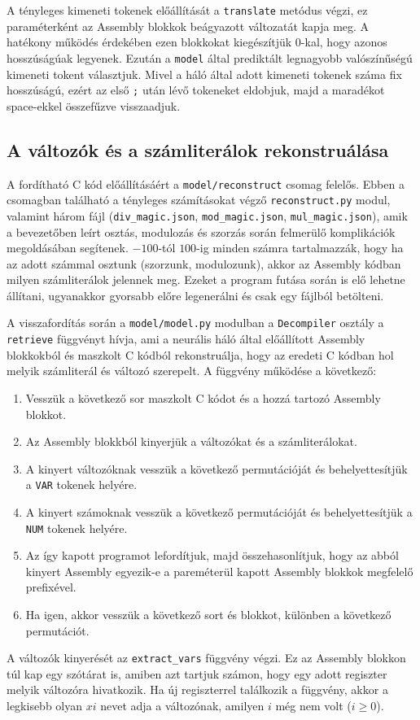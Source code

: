 A tényleges kimeneti tokenek előállítását a \texttt{translate} metódus végzi, ez paraméterként az Assembly
blokkok beágyazott változatát kapja meg. A hatékony működés érdekében ezen blokkokat kiegészítjük $0$-kal, hogy
azonos hosszúságúak legyenek. Ezután a \texttt{model} által prediktált legnagyobb valószínűségú kimeneti tokent
választjuk. Mivel a háló által adott kimeneti tokenek száma fix hosszúságú, ezért az első \texttt{;} után
lévő tokeneket eldobjuk, majd a maradékot space-ekkel összefűzve visszaadjuk.

\subsection{A változók és a számliterálok rekonstruálása}
A fordítható C kód előállításáért a \texttt{model/reconstruct} csomag felelős. Ebben a csomagban található
a tényleges számításokat végző \texttt{reconstruct.py} modul, valamint három fájl (\texttt{div\_magic.json},
\texttt{mod\_magic.json}, \texttt{mul\_magic.json}), amik a bevezetőben leírt osztás, modulozás és szorzás
során felmerülő komplikációk megoldásában segítenek. $-100$-tól $100$-ig minden számra tartalmazzák, hogy
ha az adott számmal osztunk (szorzunk, modulozunk), akkor az Assembly kódban milyen számliterálok jelennek meg.
Ezeket a program futása során is elő lehetne állítani, ugyanakkor gyorsabb előre legenerálni és csak egy fájlból
betölteni.

A visszafordítás során a \texttt{model/model.py} modulban a \texttt{Decompiler} osztály a \texttt{retrieve}
függvényt hívja, ami a neurális háló által előállított Assembly blokkokból és maszkolt C kódból rekonstruálja,
hogy az eredeti C kódban hol melyik számliterál és változó szerepelt. A függvény működése a következő:
\begin{enumerate}
    \item Vesszük a következő sor maszkolt C kódot és a hozzá tartozó Assembly blokkot.
    \item Az Assembly blokkból kinyerjük a változókat és a számliterálokat.
    \item A kinyert változóknak vesszük a következő permutációját és behelyettesítjük a \texttt{VAR} tokenek helyére.
    \item A kinyert számoknak vesszük a következő permutációját és behelyettesítjük a \texttt{NUM} tokenek helyére.
    \item Az így kapott programot lefordítjuk, majd összehasonlítjuk, hogy az abból kinyert Assembly egyezik-e
          a pareméterül kapott Assembly blokkok megfelelő prefixével.
    \item Ha igen, akkor vesszük a következő sort és blokkot, különben a következő permutációt.
\end{enumerate}
A változók kinyerését az \texttt{extract\_vars} függvény végzi. Ez az Assembly blokkon túl kap egy szótárat is,
amiben azt tartjuk számon, hogy egy adott regiszter melyik változóra hivatkozik. Ha új regiszterrel találkozik
a függvény, akkor a legkisebb olyan $xi$ nevet adja a változónak, amilyen $i$ még nem volt ($i\ge0$).

